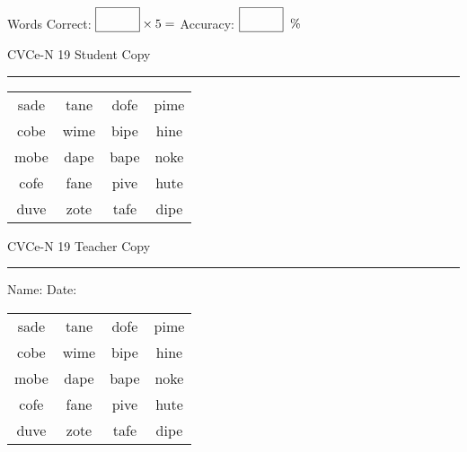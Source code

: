 \documentclass{memoir}
\begin{document}
\small

Words Correct: $\fbox{\phantom{\huge 100}} \times 5 = $ Accuracy: $\fbox{\phantom{\huge 100}}\;\; \%$ 

\vfill

\newpage


\footnotesize \noindent
CVCe-N 19 \hfill Student Copy
\smallskip
\hrule

\Large

\setlength{\tabcolsep}{14pt}
\def\arraystretch{2}

{\selectfont


\begin{vplace}[0.5]
\begin{center}
\begin{tabular}{cccc}
sade & tane & dofe & pime \\
cobe & wime & bipe & hine \\
mobe & dape & bape & noke \\
cofe & fane & pive & hute \\
duve & zote & tafe & dipe \\
\end{tabular}
\end{center}
\end{vplace}

}

\newpage

\footnotesize \noindent
CVCe-N 19 \hfill Teacher Copy
\smallskip
\hrule

\small

\vfill

\noindent
Name: \underline{\hspace{1.75in}} \hfill Date: \underline{\hspace{1in}}

\Large

{\selectfont


\begin{vplace}[0.5]
\begin{center}
\begin{tabular}{cccc}
sade & tane & dofe & pime \\
cobe & wime & bipe & hine \\
mobe & dape & bape & noke \\
cofe & fane & pive & hute \\
duve & zote & tafe & dipe \\
\end{tabular}
\end{center}
\end{vplace}



}
\end{document}
